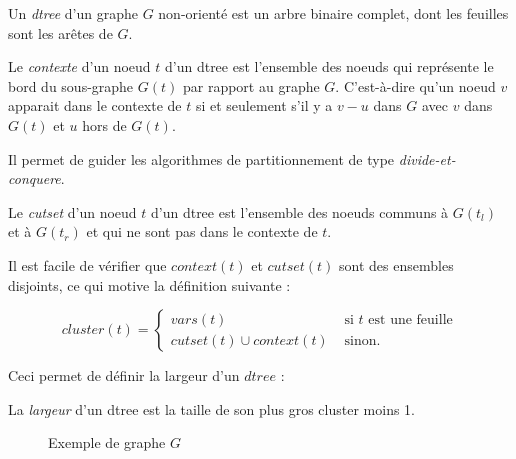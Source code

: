 \documentclass{article}
\begin{document}
\begin{mdef}
Un \emph{dtree} d'un graphe $G$ non-orienté est un arbre binaire
complet, dont les feuilles sont les arêtes de $G$.
\end{mdef}

\begin{mdef}
Le \emph{contexte} d'un noeud $t$ d'un dtree est l'ensemble des noeuds
qui représente le bord du sous-graphe $G(t)$ par rapport au graphe
$G$. C'est-à-dire qu'un noeud $v$ apparait dans le contexte de $t$ si
et seulement s'il y a $v-u$ dans $G$ avec $v$ dans $G(t)$ et $u$ hors
de $G(t)$.
\end{mdef}
Il permet de guider les algorithmes de partitionnement de type
\emph{divide-et-conquere}.

\begin{mdef}
Le \emph{cutset} d'un noeud $t$ d'un dtree est l'ensemble des noeuds
communs à $G(t_l)$ et à $G(t_r)$ et qui ne sont pas dans le contexte
de $t$.
\end{mdef}

Il est facile de vérifier que $context(t)$ et $cutset(t)$ sont des
ensembles disjoints, ce qui motive la définition suivante : 

\begin{mdef}
$$
cluster(t) = \left\{
    \begin{array}{ll}
        vars(t) & \mbox{ si $t$ est une feuille} \\
        cutset(t) \cup context(t) & \mbox{ sinon.}
    \end{array}
\right.
$$
\end{mdef}

Ceci permet de définir la largeur d'un $dtree$ : 
\begin{mdef}
La \emph{largeur} d'un dtree est la taille de son plus gros cluster
moins 1.
\end{mdef}

\begin{figure}[h!]
 \centering
{}
\caption{Exemple de graphe $G$}
\end{figure}
\end{document}

